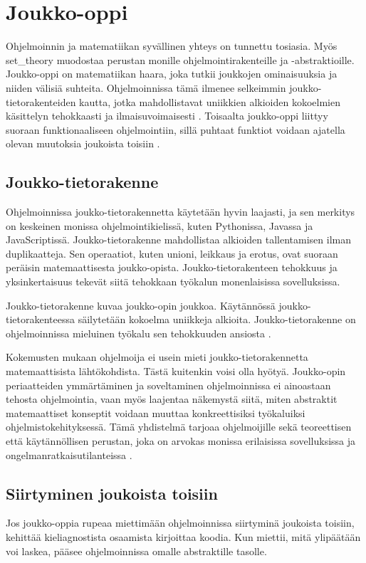 \section{Joukko-oppi}

Ohjelmoinnin ja matematiikan syvällinen yhteys on tunnettu tosiasia. Myös \gls{set_theory} muodostaa perustan monille ohjelmointirakenteille ja -abstraktioille. Joukko-oppi on matematiikan haara, joka tutkii joukkojen ominaisuuksia ja niiden välisiä suhteita. Ohjelmoinnissa tämä ilmenee selkeimmin joukko-tietorakenteiden kautta, jotka mahdollistavat uniikkien alkioiden kokoelmien käsittelyn tehokkaasti ja ilmaisuvoimaisesti \cite{mdn_set,mdn_set_methods}. Toisaalta joukko-oppi liittyy suoraan funktionaaliseen ohjelmointiin, sillä puhtaat funktiot voidaan ajatella olevan muutoksia joukoista toisiin \cite{bartosz_category_for_progamers}.

\subsection{Joukko-tietorakenne}

Ohjelmoinnissa joukko-tietorakennetta käytetään hyvin laajasti, ja sen merkitys on keskeinen monissa ohjelmointikielissä, kuten Pythonissa, Javassa ja JavaScriptissä. Joukko-tietorakenne mahdollistaa alkioiden tallentamisen ilman duplikaatteja. Sen operaatiot, kuten unioni, leikkaus ja erotus, ovat suoraan peräisin matemaattisesta joukko-opista. Joukko-tietorakenteen tehokkuus ja yksinkertaisuus tekevät siitä tehokkaan työkalun monenlaisissa sovelluksissa. \citep{mdn_set,ecma_spec}

Joukko-tietorakenne kuvaa joukko-opin joukkoa. Käytännössä joukko-tietorakenteessa säilytetään kokoelma uniikkeja alkioita. Joukko-tietorakenne on ohjelmoinnissa mieluinen työkalu sen tehokkuuden ansiosta \cite{ecma_spec}.

Kokemusten mukaan ohjelmoija ei usein mieti joukko-tietorakennetta matemaattisista lähtökohdista. Tästä kuitenkin voisi olla hyötyä. Joukko-opin periaatteiden ymmärtäminen ja soveltaminen ohjelmoinnissa ei ainoastaan tehosta ohjelmointia, vaan myös laajentaa näkemystä siitä, miten abstraktit matemaattiset konseptit voidaan muuttaa konkreettisiksi työkaluiksi ohjelmistokehityksessä. Tämä yhdistelmä tarjoaa ohjelmoijille sekä teoreettisen että käytännöllisen perustan, joka on arvokas monissa erilaisissa sovelluksissa ja ongelmanratkaisutilanteissa \cite{bartosz_category_for_progamers}.

\subsection{Siirtyminen joukoista toisiin}
Jos joukko-oppia rupeaa miettimään ohjelmoinnissa siirtyminä joukoista toisiin, kehittää kieliagnostista osaamista kirjoittaa koodia. Kun miettii, mitä ylipäätään voi laskea, pääsee ohjelmoinnissa omalle abstraktille tasolle. \citep{Tan2004,BlellochHarper2015}

